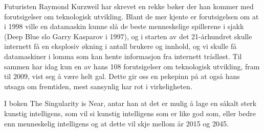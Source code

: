 Futuristen Raymond Kurzweil har skrevet en rekke bøker der han kommer med forutsigelser
om teknologisk utvikling. Blant de mer kjente er forutsigelsen om at i 1998 ville en datamaskin kunne slå de beste menneskelige spillerene i sjakk (Deep Blue slo Garry Kasparov i 1997), og i starten av det 21-århundret skulle internett få en eksplosiv økning i antall brukere og innhold, og vi skulle få datamaskiner i lomma som kan hente informasjon fra internett trådløst.
Til sammen har idag kun en av hans 108 forutsigelser om teknologisk utvikling, fram til
2009, vist seg å være helt gal.
Dette gir oss en pekepinn på at også hans utsagn om fremtiden, mest sansynlig
har rot i virkeligheten.

I boken The Singularity is Near, antar han at det er mulig å lage en såkalt
sterk kunstig intelligens, som vil si kunstig intelligens som er like god som,
eller bedre enn menneskelig intelligens og at dette vil skje mellom år 2015 og 2045.
